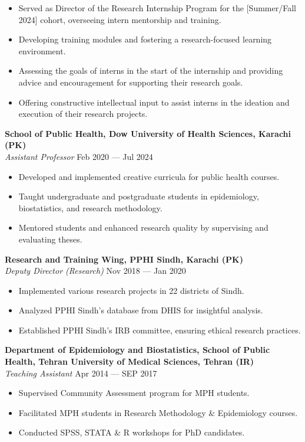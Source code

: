 \documentclass[
  letterpaper,
  DIV=11,
  numbers=noendperiod]{scrartcl}
\begin{document}
\begin{itemize}
\item
  Served as Director of the Research Internship Program for the
  {[}Summer/Fall 2024{]} cohort, overseeing intern mentorship and
  training.
\item
  Developing training modules and fostering a research-focused learning
  environment.
\item
  Assessing the goals of interns in the start of the internship and
  providing advice and encouragement for supporting their research
  goals.
\item
  Offering constructive intellectual input to assist interns in the
  ideation and execution of their research projects.
\end{itemize}

\textbf{{School of Public Health, Dow University of Health Sciences,
Karachi (PK)}}\\
\emph{Assistant Professor} {Feb 2020 --- Jul 2024}

\begin{itemize}
\item
  Developed and implemented creative curricula for public health
  courses.
\item
  Taught undergraduate and postgraduate students in epidemiology,
  biostatistics, and research methodology.
\item
  Mentored students and enhanced research quality by supervising and
  evaluating theses.
\end{itemize}

\textbf{{Research and Training Wing, PPHI Sindh, Karachi (PK)}}\\
\emph{Deputy Director (Research)} {Nov 2018 --- Jan 2020}

\begin{itemize}
\item
  Implemented various research projects in 22 districts of Sindh.
\item
  Analyzed PPHI Sindh's database from DHIS for insightful analysis.
\item
  Established PPHI Sindh's IRB committee, ensuring ethical research
  practices.
\end{itemize}

\textbf{{Department of Epidemiology and Biostatistics, School of Public
Health, Tehran University of Medical Sciences, Tehran (IR)}}\\
\emph{Teaching Assistant} {Apr 2014 --- SEP 2017}

\begin{itemize}
\item
  Supervised Community Assessment program for MPH students.
\item
  Facilitated MPH students in Research Methodology \& Epidemiology
  courses.
\item
  Conducted SPSS, STATA \& R workshops for PhD candidates.
\end{itemize}
\end{document}
